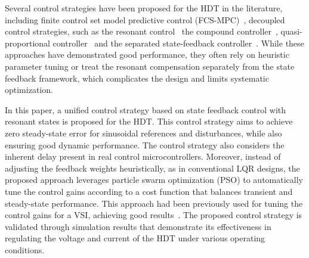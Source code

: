 Several control strategies have been proposed for the HDT in the literature, including finite control set model predictive control (FCS-MPC)~\cite{costaFourlegMatrixConverter2022}, decoupled control strategies, such as the resonant control~\cite{matelskiBadaniaEksperymentalneTransformatora2023} the compound controller~\cite{liuCompoundControlSystem2020}, quasi-proportional controller~\cite{liuQuasiProportionalResonantControlHybrid2022} and the separated state-feedback controller~\cite{carrenoStateFeedbackControlHybrid2024}. While these approaches have demonstrated good performance, they often rely on heuristic parameter tuning or treat the resonant compensation separately from the state feedback framework, which complicates the design and limits systematic optimization.

In this paper, a unified control strategy based on state feedback control with resonant states is proposed for the HDT. This control strategy aims to achieve zero steady-state error for sinusoidal references and disturbances, while also ensuring good dynamic performance. The control strategy also considers the inherent delay present in real control microcontrollers. Moreover, instead of adjusting the feedback weights heuristically, as in conventional LQR designs, the proposed approach leverages particle swarm optimization (PSO) to automatically tune the control gains according to a cost function that balances transient and steady-state performance. This approach had been previously used for tuning the control gains for a VSI, achieving good results~\cite{ufnalskiParticleSwarmOptimization2015,galcckiParticleSwarmOptimization2018}. The proposed control strategy is validated through simulation results that demonstrate its effectiveness in regulating the voltage and current of the HDT under various operating conditions.
